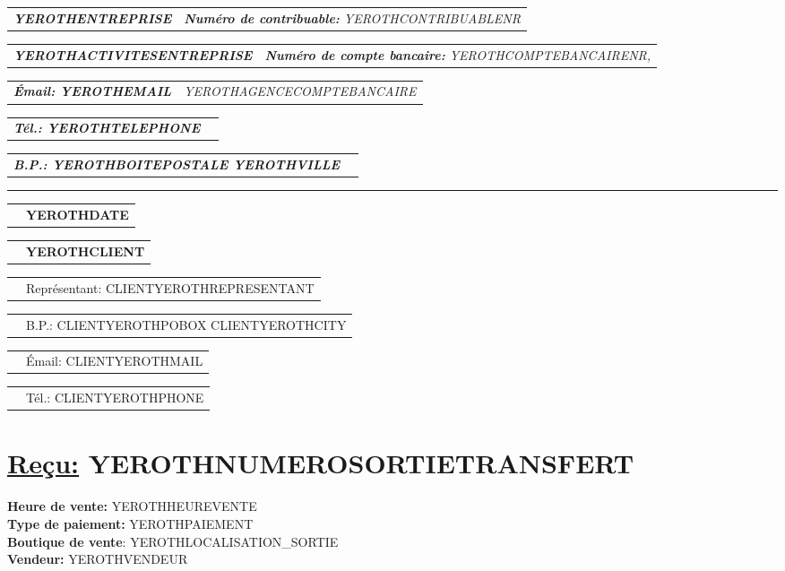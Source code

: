 \documentclass[10pt,YEROTHPAPERSPEC]{article} %
\makeatletter
\newcommand{\headerrow}[2]
{\begin{tabular*}{\linewidth}{l@{\extracolsep{\fill}}r}
	#1 &
	#2 \\
\end{tabular*}}
\newcommand{\emphbold}[1]{\textbf{\emph{#1}}\xspace}
\makeatother
\begin{document}
\bigskip

\headerrow
	{\emphbold{YEROTHENTREPRISE}}
	{\emph{\textbf{Num\'ero de contribuable:} YEROTHCONTRIBUABLENR}}
\headerrow
	{\emphbold{YEROTHACTIVITESENTREPRISE}}
	{\emph{\textbf{Num\'ero de compte bancaire:} YEROTHCOMPTEBANCAIRENR,}}
\headerrow
	{\emphbold{\'Email: YEROTHEMAIL}}
	{\emph{YEROTHAGENCECOMPTEBANCAIRE}}
\headerrow
	{\emphbold{T\'el.: YEROTHTELEPHONE}}
	{}
\headerrow
	{\emphbold{B.P.: YEROTHBOITEPOSTALE YEROTHVILLE}}
	{}
	
\hrule

\headerrow
	{}
	{\textbf{YEROTHDATE}}

\vspace*{0.9cm}

\headerrow
{}
{\textbf{YEROTHCLIENT}}
\headerrow
{}
{Repr\'esentant: CLIENTYEROTHREPRESENTANT}
\headerrow
{}
{B.P.: CLIENTYEROTHPOBOX CLIENTYEROTHCITY}
\headerrow
{}
{\'Email: CLIENTYEROTHMAIL}
\headerrow
{}
{T\'el.: CLIENTYEROTHPHONE}

\section*{\underline{Re\c{c}u:} YEROTHNUMEROSORTIETRANSFERT}
\textbf{Heure de vente:} YEROTHHEUREVENTE\\
\textbf{Type de paiement:} YEROTHPAIEMENT\\
\textbf{Boutique de vente}: YEROTHLOCALISATION_SORTIE\\
\textbf{Vendeur:} YEROTHVENDEUR

\vspace{0.3cm} 
\end{document}
